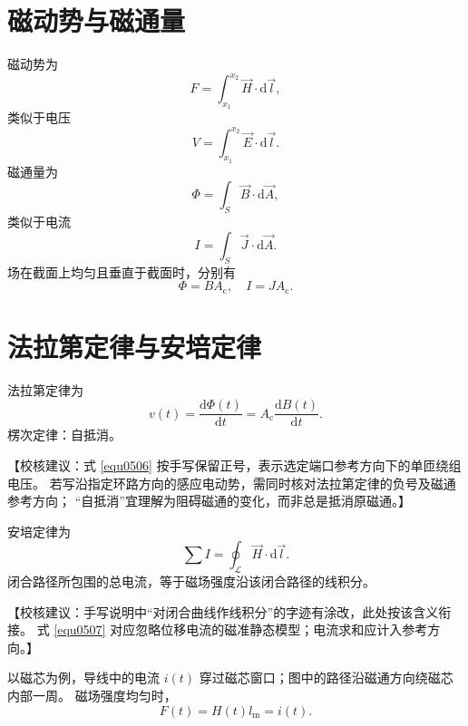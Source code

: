 \documentclass[
  12pt,
  UTF8,
  a4paper,
  fontset=fandol,
  oneside,
  openany
]{ctexrep}
\newcommand{\reviewnote}[1]{%
  \par\smallskip
  {\color{reviewgray}\small\noindent【校核建议：#1】\par}
  \smallskip
}
\begin{document}
\section{磁动势与磁通量}

磁动势为
\begin{equation}
  F=\int_{x_1}^{x_2}\vec H\cdot\mathrm{d}\vec l,
  \label{equ0501}
\end{equation}
类似于电压
\begin{equation}
  V=\int_{x_1}^{x_2}\vec E\cdot\mathrm{d}\vec l.
  \label{equ0502}
\end{equation}
磁通量为
\begin{equation}
  \Phi=\int_S\vec B\cdot\mathrm{d}\vec A,
  \label{equ0503}
\end{equation}
类似于电流
\begin{equation}
  I=\int_S\vec J\cdot\mathrm{d}\vec A.
  \label{equ0504}
\end{equation}
场在截面上均匀且垂直于截面时，分别有
\begin{equation}
  \Phi=BA_{\mathrm{c}},\quad I=JA_{\mathrm{c}}.
  \label{equ0505}
\end{equation}

\section{法拉第定律与安培定律}

法拉第定律为
\begin{equation}
  v(t)=\frac{\mathrm{d}\Phi(t)}{\mathrm{d}t}
  =A_{\mathrm{c}}\frac{\mathrm{d}B(t)}{\mathrm{d}t}.
  \label{equ0506}
\end{equation}
楞次定律：自抵消。
\reviewnote{式 \eqref{equ0506} 按手写保留正号，表示选定端口参考方向下的单匝绕组电压。
  若写沿指定环路方向的感应电动势，需同时核对法拉第定律的负号及磁通参考方向；
  “自抵消”宜理解为阻碍磁通的变化，而非总是抵消原磁通。}

安培定律为
\begin{equation}
  \sum I=\oint_{\mathcal L}\vec H\cdot\mathrm{d}\vec l.
  \label{equ0507}
\end{equation}
闭合路径所包围的总电流，等于磁场强度沿该闭合路径的线积分。
\reviewnote{手写说明中“对闭合曲线作线积分”的字迹有涂改，此处按该含义衔接。
  式 \eqref{equ0507} 对应忽略位移电流的磁准静态模型；电流求和应计入参考方向。}

以磁芯为例，导线中的电流 $i(t)$ 穿过磁芯窗口；图中的路径沿磁通方向绕磁芯内部一周。
磁场强度均匀时，
\begin{equation}
  F(t)=H(t)l_{\mathrm{m}}=i(t).
  \label{equ0508}
\end{equation}
\end{document}
